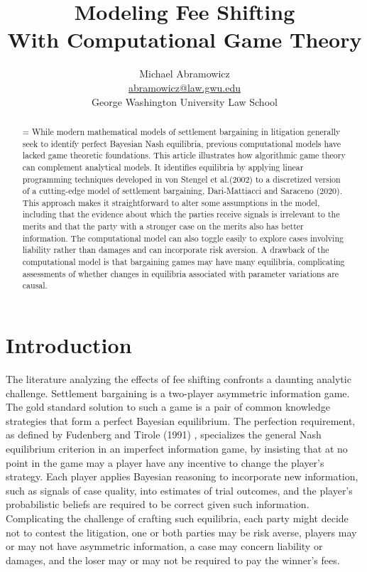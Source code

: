 \documentclass{article}
\newenvironment{nohyphen}
  {\tolerance=1%
   \emergencystretch=\maxdimen%
   \hyphenpenalty=10000%
   \hbadness=10000}%
  {\par}%
\begin{document}
\title{Modeling Fee Shifting \\ With Computational Game Theory}
\author{Michael Abramowicz \\ \href{mailto:abramowicz@law.gwu.edu}{abramowicz@law.gwu.edu} \\ George Washington University Law School}

\maketitle

\begin{abstract}
\begin{nohyphen}
While modern mathematical models of settlement bargaining in litigation generally seek to identify perfect Bayesian Nash equilibria, previous computational models have lacked game theoretic foundations. This article illustrates how algorithmic game theory can complement analytical models. It identifies equilibria by applying linear programming techniques developed in von Stengel et al.\@ (2002) to a discretized version of a cutting-edge model of settlement bargaining, Dari-Mattiacci and Saraceno (2020). This approach makes it straightforward to alter some assumptions in the model, including that the evidence about which the parties receive signals is irrelevant to the merits and that the party with a stronger case on the merits also has better information. The computational model can also toggle easily to explore cases involving liability rather than damages and can incorporate risk aversion. A drawback of the computational model is that bargaining games may have many equilibria, complicating assessments of whether changes in equilibria associated with parameter variations are causal.
\end{nohyphen}
\end{abstract}

\section{Introduction}
The literature analyzing the effects of fee shifting confronts a daunting analytic challenge. Settlement bargaining is a two-player asymmetric information game. The gold standard solution to such a game is a pair of common knowledge strategies that form a perfect Bayesian equilibrium. The perfection requirement, as defined by Fudenberg and Tirole (1991) \cite{fudenberg}, specializes the general Nash \cite{nash} equilibrium criterion in an imperfect information game, by insisting that at no point in the game may a player have any incentive to change the player's strategy. Each player applies Bayesian reasoning to incorporate new information, such as signals of case quality, into estimates of trial outcomes, and the player's probabilistic beliefs are required to be correct given such information. Complicating the challenge of crafting such equilibria, each party might decide not to contest the litigation, one or both parties may be risk averse, players may or may not have asymmetric information, a case may concern liability or damages, and the loser may or may not be required to pay the winner's fees.
\end{document}
